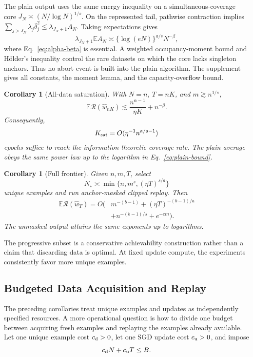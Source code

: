 \documentclass[letterpaper]{article}
\newtheorem{corollary}[theorem]{Corollary}
\newcommand{\E}{\mathbb E}
\newcommand{\R}{\mathcal R}
\begin{document}
The plain output uses the same energy inequality on a simultaneous-coverage
core
$J_N\asymp(N/\log N)^{1/s}$. On the represented tail,
pathwise contraction implies
$\sum_{j>J_N}\lambda_j\bar\delta_j^2
\le\lambda_{J_N+1}A_N$. Taking expectations gives
\[
\lambda_{J_N+1}\E A_N
\asymp \{\log(eN)\}^{a/s}N^{-\beta},
\]
where Eq.~\eqref{eq:alpha-beta} is essential. A weighted occupancy-moment bound
and H\"older's inequality control the rare datasets on which the core lacks
singleton anchors. Thus no abort event is built into the plain algorithm. The
supplement gives all constants, the moment lemma, and the capacity-overflow
bound.

\begin{corollary}[All-data saturation]
\label{cor:alldata}
With $N=n$, $T=nK$, and $m\gtrsim n^{1/s}$,
\[
\E\R(\widehat w_{nK})
\lesssim \frac{n^{\alpha-1}}{\eta K}+n^{-\beta}.
\]
Consequently,
\begin{equation}
K_{\rm sat}=O(\eta^{-1}n^{a/s-1})
\label{eq:ksat-sharp}
\end{equation}
epochs suffice to reach the information-theoretic coverage rate. The plain
average obeys the same power law up to the logarithm in
Eq.~\eqref{eq:plain-bound}.
\end{corollary}

\begin{corollary}[Full frontier]
\label{cor:full}
Given $n,m,T$, select
\[
N_\star\asymp\min\{n,m^s,(\eta T)^{s/a}\}
\]
unique examples and run anchor-masked clipped replay. Then
\begin{equation}
\begin{aligned}
\E\R(\widehat w_T)=O\bigl(&m^{-(b-1)}
 +(\eta T)^{-(b-1)/a}\\
&+n^{-(b-1)/s}+e^{-cm}\bigr).
\end{aligned}
\label{eq:full-frontier-rate}
\end{equation}
The unmasked output attains the same exponents up to logarithms.
\end{corollary}

The progressive subset is a conservative achievability construction rather
than a claim that discarding data is optimal. At fixed update compute, the
experiments consistently favor more unique examples.

\subsection{Budgeted Data Acquisition and Replay}

The preceding corollaries treat unique examples and updates as independently
specified resources. A more operational question is how to divide one budget
between acquiring fresh examples and replaying the examples already available.
Let one unique example cost $c_{\rm d}>0$, let one SGD update cost
$c_{\rm u}>0$, and impose
\begin{equation}
 c_{\rm d}N+c_{\rm u}T\le B.
 \label{eq:budget-constraint}
\end{equation}
\end{document}
